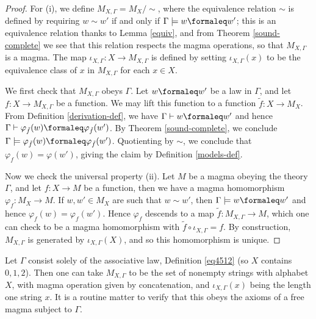 \begin{proof}
  For (i), we define $M_{X,\Gamma} = M_X / \sim$, where the equivalence relation $\sim$ is defined by requiring $w \sim w'$ if and only if $\Gamma \models w \formaleq w'$; this is an equivalence relation thanks to Lemma \ref{equiv}, and from Theorem \ref{sound-complete} we see that this relation respects the magma operations, so that $M_{X,\Gamma}$ is a magma. The map $\iota_{X,\Gamma}: X \to M_{X,\Gamma}$ is defined by setting $\iota_{X,\Gamma}(x)$ to be the equivalence class of $x$ in $M_{X,\Gamma}$ for each $x \in X$.

  We first check that $M_{X,\Gamma}$ obeys $\Gamma$. Let $w \formaleq w'$ be a law in $\Gamma$, and let $f: X \to M_{X,\Gamma}$ be a function. We may lift this function to a function $\tilde{f}: X \to M_X$. From Definition \ref{derivation-def}, we have $\Gamma \vdash w \formaleq w'$ and hence $\Gamma \vdash \varphi_{\tilde{f}}(w) \formaleq \varphi_{\tilde{f}}(w')$. By Theorem \ref{sound-complete}, we conclude $\Gamma \models \varphi_{\tilde{f}}(w) \formaleq \varphi_{\tilde{f}}(w')$. Quotienting by $\sim$, we conclude that $\varphi_f(w) = \varphi(w')$, giving the claim by Definition \ref{models-def}.

  Now we check the universal property (ii). Let $M$ be a magma obeying the theory $\Gamma$, and let $f: X \to M$ be a function, then we have a magma homomorphism $\varphi_f: M_X \to M$. If $w, w' \in M_X$ are such that $w \sim w'$, then $\Gamma \models w \formaleq w'$ and hence $\varphi_f(w) = \varphi_f(w')$. Hence $\varphi_f$ descends to a map $\tilde{f}: M_{X,\Gamma} \to M$, which one can check to be a magma homomorphism with $\tilde{f} \circ \iota_{X,\Gamma} = f$. By construction, $M_{X,\Gamma}$ is generated by $\iota_{X,\Gamma}(X)$, and so this homomorphism is unique.
\end{proof}

\begin{example}
  Let $\Gamma$ consist solely of the associative law, Definition \ref{eq4512} (so $X$ contains $0,1,2$). Then one can take $M_{X,\Gamma}$ to be the set of nonempty strings with alphabet $X$, with magma operation given by concatenation, and $\iota_{X,\Gamma}(x)$ being the length one string $x$. It is a routine matter to verify that this obeys the axioms of a free magma subject to $\Gamma$.
\end{example}

